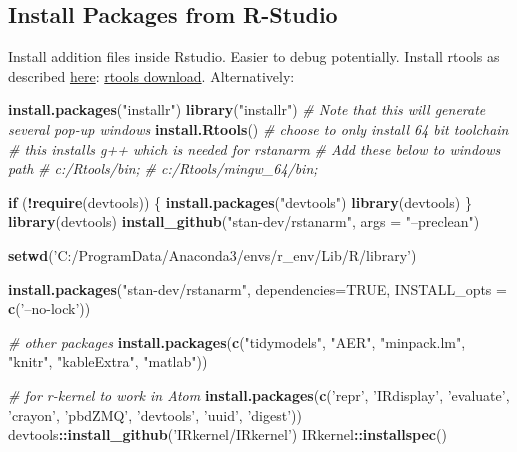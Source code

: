\documentclass[]{article}
\newenvironment{Shaded}{\begin{snugshade}}{\end{snugshade}}
\newcommand{\CommentTok}[1]{\textcolor[rgb]{0.56,0.35,0.01}{\textit{#1}}}
\newcommand{\ControlFlowTok}[1]{\textcolor[rgb]{0.13,0.29,0.53}{\textbf{#1}}}
\newcommand{\DataTypeTok}[1]{\textcolor[rgb]{0.13,0.29,0.53}{#1}}
\newcommand{\KeywordTok}[1]{\textcolor[rgb]{0.13,0.29,0.53}{\textbf{#1}}}
\newcommand{\NormalTok}[1]{#1}
\newcommand{\OperatorTok}[1]{\textcolor[rgb]{0.81,0.36,0.00}{\textbf{#1}}}
\newcommand{\OtherTok}[1]{\textcolor[rgb]{0.56,0.35,0.01}{#1}}
\newcommand{\StringTok}[1]{\textcolor[rgb]{0.31,0.60,0.02}{#1}}
\begin{document}
\hypertarget{install-packages-from-r-studio}{%
\subsection{Install Packages from
R-Studio}\label{install-packages-from-r-studio}}

Install addition files inside Rstudio. Easier to debug potentially.
Install rtools as described
\href{https://thecoatlessprofessor.com/programming/cpp/installing-rtools-for-compiled-code-via-rcpp/}{here}:
\href{https://cran.r-project.org/bin/windows/Rtools/}{rtools download}.
Alternatively:

\begin{Shaded}
\begin{Highlighting}[]
\KeywordTok{install.packages}\NormalTok{(}\StringTok{"installr"}\NormalTok{)}
\KeywordTok{library}\NormalTok{(}\StringTok{"installr"}\NormalTok{)}
\CommentTok{# Note that this will generate several pop-up windows}
\KeywordTok{install.Rtools}\NormalTok{()}
\CommentTok{# choose to only install 64 bit toolchain}
\CommentTok{# this installs g++ which is needed for rstanarm}
\CommentTok{# Add these below to windows path}
\CommentTok{# c:/Rtools/bin;}
\CommentTok{# c:/Rtools/mingw_64/bin;}

\ControlFlowTok{if}\NormalTok{ (}\OperatorTok{!}\KeywordTok{require}\NormalTok{(devtools)) \{}
  \KeywordTok{install.packages}\NormalTok{(}\StringTok{"devtools"}\NormalTok{)}
  \KeywordTok{library}\NormalTok{(devtools)}
\NormalTok{\}}
\KeywordTok{library}\NormalTok{(devtools)}
\KeywordTok{install_github}\NormalTok{(}\StringTok{"stan-dev/rstanarm"}\NormalTok{, }\DataTypeTok{args =} \StringTok{"--preclean"}\NormalTok{)}

\KeywordTok{setwd}\NormalTok{(}\StringTok{'C:/ProgramData/Anaconda3/envs/r_env/Lib/R/library'}\NormalTok{)}

\KeywordTok{install.packages}\NormalTok{(}\StringTok{"stan-dev/rstanarm"}\NormalTok{, }\DataTypeTok{dependencies=}\OtherTok{TRUE}\NormalTok{, }\DataTypeTok{INSTALL_opts =} \KeywordTok{c}\NormalTok{(}\StringTok{'--no-lock'}\NormalTok{))}

\CommentTok{# other packages}
\KeywordTok{install.packages}\NormalTok{(}\KeywordTok{c}\NormalTok{(}\StringTok{"tidymodels"}\NormalTok{, }\StringTok{"AER"}\NormalTok{, }\StringTok{"minpack.lm"}\NormalTok{, }\StringTok{"knitr"}\NormalTok{, }\StringTok{"kableExtra"}\NormalTok{, }\StringTok{"matlab"}\NormalTok{))}

\CommentTok{# for r-kernel to work in Atom}
\KeywordTok{install.packages}\NormalTok{(}\KeywordTok{c}\NormalTok{(}\StringTok{'repr'}\NormalTok{, }\StringTok{'IRdisplay'}\NormalTok{, }\StringTok{'evaluate'}\NormalTok{, }\StringTok{'crayon'}\NormalTok{, }\StringTok{'pbdZMQ'}\NormalTok{, }\StringTok{'devtools'}\NormalTok{, }\StringTok{'uuid'}\NormalTok{, }\StringTok{'digest'}\NormalTok{))}
\NormalTok{devtools}\OperatorTok{::}\KeywordTok{install_github}\NormalTok{(}\StringTok{'IRkernel/IRkernel'}\NormalTok{)}
\NormalTok{IRkernel}\OperatorTok{::}\KeywordTok{installspec}\NormalTok{()}


\end{Highlighting}
\end{Shaded}
\end{document}
